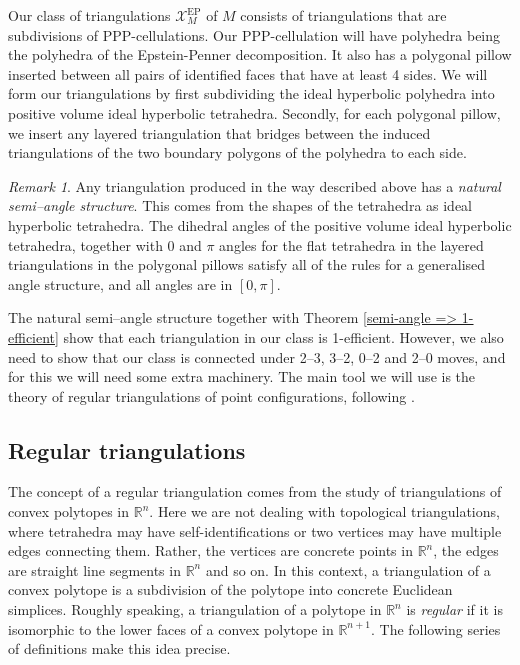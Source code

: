 \documentclass[12pt]{amsart}
\theoremstyle{definition}
\theoremstyle{remark}
\newtheorem{rmk}[thm]{Remark}
\def\R{\mathbb{R}}
\def\calX{\mathcal X}
\def\EP{\mathrm{EP}}
\begin{document}
Our class of triangulations $\calX_M^{\EP}$ of $M$ consists of triangulations that are subdivisions of PPP-cellulations. Our PPP-cellulation will have polyhedra being the polyhedra of the Epstein-Penner decomposition. It also has a polygonal pillow inserted between all pairs of identified faces that have at least 4 sides. We will form our triangulations by first subdividing the ideal hyperbolic polyhedra into positive volume ideal hyperbolic tetrahedra. Secondly, for each polygonal pillow, we insert any layered triangulation that bridges between the induced triangulations of the two boundary polygons of the polyhedra to each side.

\begin{rmk}\label{rem:natural semi-angle structure}
Any triangulation produced in the way described above has a \emph{natural semi--angle structure}. This comes from the shapes of the tetrahedra as ideal hyperbolic tetrahedra. The dihedral angles of the positive volume ideal hyperbolic tetrahedra, together with 0 and $\pi$ angles for the flat tetrahedra in the layered triangulations in the polygonal pillows satisfy all of the rules for a generalised angle structure, and all angles are in $[0,\pi]$. 
\end{rmk}

The natural semi--angle structure together with Theorem \ref{semi-angle => 1-efficient} show that each triangulation in our class is 1-efficient. However, we also need to show that our class is connected under 2--3, 3--2, 0--2 and 2--0 moves, and for this we will need some extra machinery. The main tool we will use is the theory of regular triangulations of point configurations, following \cite{DeLoera:book}.

\subsection{Regular triangulations}

The concept of a regular triangulation comes from the study of triangulations of convex polytopes in $\R^n$. Here we are not dealing with topological triangulations, where tetrahedra may have self-identifications or two vertices may have multiple edges connecting them. Rather, the vertices are concrete points in $\R^n$, the edges are straight line segments in $\R^n$ and so on. In this context, a triangulation of a convex polytope is a subdivision of the polytope into concrete Euclidean simplices. Roughly speaking, a triangulation of a polytope in $\R^n$ is \emph{regular} if it is isomorphic to the lower faces of a convex polytope in $\R^{n+1}$. The following series of definitions make this idea precise.
\end{document}
